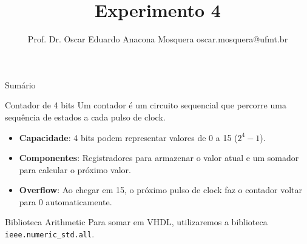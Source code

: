\documentclass[aspectratio=169]{beamer}
\title[Arquitetura de Computadores]{\huge  Experimento 4} %
\author[Prof. Dr. Oscar Eduardo Anacona Mosquera]{Prof. Dr. Oscar Eduardo Anacona Mosquera \newline\newline 
	\scriptsize{oscar.mosquera@ufmt.br}
}%
\begin{document}
	\begin{frame}[plain]
		\titlepage
	\end{frame}
	
	\begin{frame}{Sumário}
		\tableofcontents
	\end{frame}
	







\begin{frame}{Contador de 4 bits}
    \justifying
    Um contador é um circuito sequencial que percorre uma sequência de estados a cada pulso de clock.
    
    \begin{itemize}
        \item \textbf{Capacidade}: 4 bits podem representar valores de 0 a 15 ($2^4 - 1$).
        \item \textbf{Componentes}: Registradores para armazenar o valor atual e um somador para calcular o próximo valor.
        \item \textbf{Overflow}: Ao chegar em 15, o próximo pulso de clock faz o contador voltar para 0 automaticamente.
    \end{itemize}
    
    \begin{block}{Biblioteca Arithmetic}
        Para somar em VHDL, utilizaremos a biblioteca \texttt{ieee.numeric\_std.all}.
    \end{block}
\end{frame}
\end{document}
